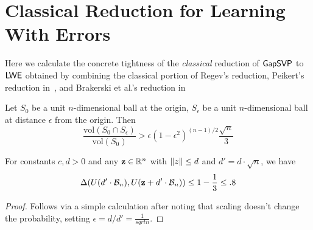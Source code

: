\section{Classical Reduction for Learning With Errors}
\label{sec:classic-reduction}

Here we calculate the concrete tightness of the \emph{classical} reduction of $\mathsf{GapSVP}$ to $\mathsf{LWE}$ obtained by combining the classical portion of Regev's reduction, 
Peikert's reduction in~\cite{DBLP:journals/eccc/Peikert08}, and
Brakerski et al.'s reduction
in~\cite{DBLP:journals/corr/BrakerskiLPRS13}



\begin{lemma}
Let $S_0$ be a unit $n$-dimensional ball at the origin, $S_{\epsilon}$ be a unit
$n$-dimensional ball at distance $\epsilon$ from the origin. Then 
\[\frac{\text{vol}(S_0  \cap S_{\epsilon})}{\text{vol}(S_0)}>\epsilon(1-\epsilon^2)^{(n-1)/2}\frac{\sqrt{n}}{3}\]
\end{lemma}

\begin{corollary}
For constants $c, d > 0$ and any $\mathbf{z} \in \mathbb{R}^n$ with $\lVert z\rVert
\leq d$ and $d'=d \cdot \sqrt{n}$, we have 
\[\Delta(U(d' \cdot \mathcal{B}_{n}), U(\mathbf{z}+d' \cdot
  \mathcal{B}_{n})) \leq 1-\frac{1}{3} \leq .8\]  
\end{corollary}

\begin{proof}
Follows via a simple calculation after noting that scaling doesn't
change the probability, setting $\epsilon=d/d'=\tfrac{1}{sqrt{n}}$. 
\end{proof}



